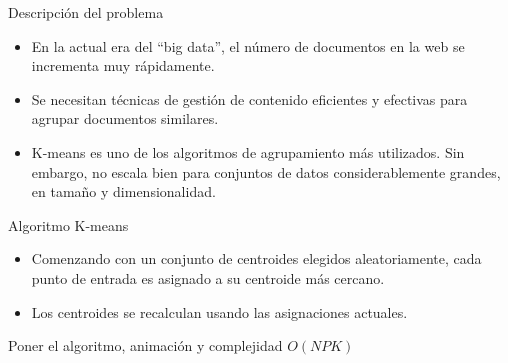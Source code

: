 \begin{frame}{Descripción del problema}
    
    \begin{itemize}
        \item 
        En la actual era del ``big data'', el 
        número de documentos en la web se 
        incrementa muy rápidamente.
        \item 
        Se necesitan técnicas de gestión 
        de contenido eficientes y efectivas
        para agrupar documentos similares.
        \item
        K-means es uno de los algoritmos de agrupamiento
        más utilizados. Sin embargo, no escala bien
        para conjuntos de datos considerablemente 
        grandes, en tamaño y dimensionalidad.
    \end{itemize}
    
    
\end{frame}

\begin{frame}{Algoritmo K-means}
\begin{itemize}
    \item Comenzando
con un conjunto de centroides elegidos aleatoriamente,
cada punto de entrada es asignado a su centroide 
más cercano.
    \item Los centroides se recalculan 
usando las asignaciones actuales.
\end{itemize}

\end{frame}


\begin{frame}
Poner el algoritmo, animación y complejidad $O(NPK)$
\end{frame}